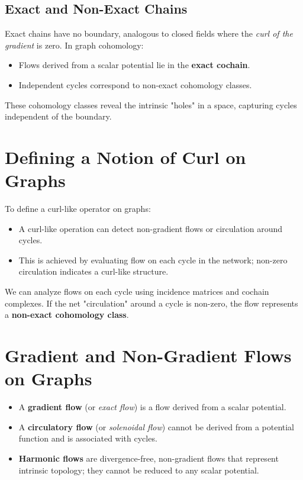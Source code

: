 \documentclass[10pt,a4paper,twocolumn]{article}
\begin{document}
	\subsection{Exact and Non-Exact Chains}
	Exact chains have no boundary, analogous to closed fields where the \textit{curl of the gradient} is zero. In graph cohomology:
	\begin{itemize}
		\item Flows derived from a scalar potential lie in the \textbf{exact cochain}.
		\item Independent cycles correspond to non-exact cohomology classes.
	\end{itemize}
	These cohomology classes reveal the intrinsic "holes" in a space, capturing cycles independent of the boundary.
	
	\section{Defining a Notion of Curl on Graphs}
	To define a curl-like operator on graphs:
	\begin{itemize}
		\item A curl-like operation can detect non-gradient flows or circulation around cycles.
		\item This is achieved by evaluating flow on each cycle in the network; non-zero circulation indicates a curl-like structure.
	\end{itemize}
	
	We can analyze flows on each cycle using incidence matrices and cochain complexes. If the net "circulation" around a cycle is non-zero, the flow represents a \textbf{non-exact cohomology class}.
	
	\section{Gradient and Non-Gradient Flows on Graphs}
	\begin{itemize}
		\item A \textbf{gradient flow} (or \textit{exact flow}) is a flow derived from a scalar potential.
		\item A \textbf{circulatory flow} (or \textit{solenoidal flow}) cannot be derived from a potential function and is associated with cycles.
		\item \textbf{Harmonic flows} are divergence-free, non-gradient flows that represent intrinsic topology; they cannot be reduced to any scalar potential.
	\end{itemize}
	
\end{document}
